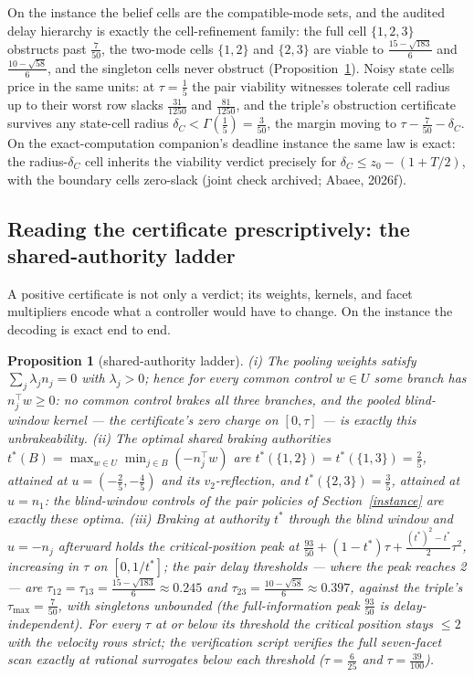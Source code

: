\documentclass[10pt,twocolumn]{article}
\theoremstyle{plain}
\newtheorem{proposition}[theorem]{Proposition}
\theoremstyle{definition}
\theoremstyle{remark}
\begin{document}
On the instance the belief cells are the compatible-mode sets, and the
audited delay hierarchy is exactly the cell-refinement family: the full
cell \(\{1,2,3\}\) obstructs past \(\tfrac7{50}\), the two-mode cells
\(\{1,2\}\) and \(\{2,3\}\) are viable to
\(\tfrac{15 - \sqrt{183}}{6}\) and \(\tfrac{10 - \sqrt{58}}{6}\),
and the singleton cells never obstruct (Proposition~\ref{prop:ladder}).
Noisy state cells price in the same units: at \(\tau = \tfrac15\) the
pair viability witnesses tolerate cell radius up to their worst row slacks
\(\tfrac{31}{1250}\) and \(\tfrac{81}{1250}\), and the triple's
obstruction certificate survives any state-cell radius \(\delta_C <
\Gamma(\tfrac15) = \tfrac3{50}\), the margin moving to
\(\tau - \tfrac7{50} - \delta_C\). On the exact-computation companion's
deadline instance the same law is exact: the radius-\(\delta_C\) cell
inherits the viability verdict precisely for
\(\delta_C \le z_0 - (1 + T/2)\), with the boundary cells zero-slack
(joint check archived; Abaee, 2026f).

\subsection{Reading the certificate prescriptively: the shared-authority ladder}\label{ladder}

A positive certificate is not only a verdict; its weights, kernels, and
facet multipliers encode what a controller would have to change. On the
instance the decoding is exact end to end.

\begin{proposition}[shared-authority ladder]\label{prop:ladder}
\emph{(i)} The pooling weights satisfy \(\sum_j \lambda_j n_j = 0\)
with \(\lambda_j > 0\); hence for every common control \(w \in U\)
some branch has \(n_j^\top w \ge 0\): no common control brakes all
three branches, and the pooled blind-window kernel --- the certificate's
zero charge on \([0, \tau]\) --- is exactly this unbrakeability.
\emph{(ii)} The optimal shared braking authorities
\(t^{*}(B) = \max_{w \in U} \min_{j \in B}(-n_j^\top w)\) are
\(t^{*}(\{1,2\}) = t^{*}(\{1,3\}) = \tfrac25\), attained at
\(u = (-\tfrac25, -\tfrac45)\) and its \(v_2\)-reflection, and
\(t^{*}(\{2,3\}) = \tfrac35\), attained at \(u = n_1\): the
blind-window controls of the pair policies of
Section~\ref{instance} are exactly these optima. \emph{(iii)} Braking at
authority \(t^{*}\) through the blind window and \(u = -n_j\)
afterward holds the critical-position peak at
\(\tfrac{93}{50} + (1 - t^{*})\tau +
\tfrac{(t^{*})^2 - t^{*}}{2}\tau^2\), increasing in \(\tau\) on
\([0, 1/t^{*}]\); the pair delay thresholds --- where the peak reaches
2 --- are \(\tau_{12} = \tau_{13} = \tfrac{15 - \sqrt{183}}{6}
\approx 0.245\) and \(\tau_{23} = \tfrac{10 - \sqrt{58}}{6} \approx
0.397\), against the triple's \(\tau_{\max} = \tfrac7{50}\), with
singletons unbounded (the full-information peak \(\tfrac{93}{50}\) is
delay-independent). For every \(\tau\) at or below its threshold the
critical position stays \(\le 2\) with the velocity rows strict; the verification script verifies the full seven-facet scan exactly at rational
surrogates below each threshold (\(\tau = \tfrac6{25}\) and
\(\tau = \tfrac{39}{100}\)).
\end{proposition}
\end{document}
